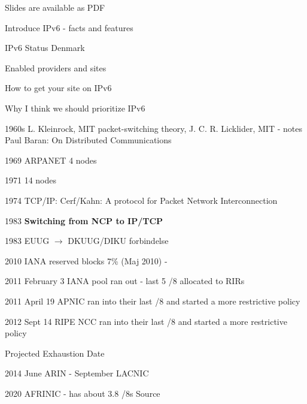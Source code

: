 \documentclass[28pt,landscape,a4paper,footrule]{foils}
\begin{document}


\vskip 2cm
\centerline{\footnotesize Slides are available as PDF}




\begin{list1}
\item Introduce IPv6 - facts and features
\item IPv6 Status Denmark
\item Enabled providers and sites
\item How to get your site on IPv6
\item Why I think we should prioritize IPv6
\end{list1}



\begin{list2}  
\item[1960s]  L. Kleinrock, MIT packet-switching theory,  J. C. R. Licklider, MIT - notes 
  Paul Baran: On Distributed Communications
\item[1969]  ARPANET 4 nodes
\item[1971]  14 nodes
\item[1974]  TCP/IP: Cerf/Kahn: A protocol for Packet
        Network Interconnection
\item[1983]  {\bf Switching from NCP to IP/TCP}
\item[1983]  EUUG $\rightarrow$ DKUUG/DIKU forbindelse
\item[2010] IANA reserved blocks 7\% (Maj 2010) - 
\item[2011] February 3 IANA pool ran out - last 5 /8 allocated to RIRs
\item[2011] April 19 APNIC ran into their last /8 and started a more restrictive policy
\item[2012] Sept 14 RIPE NCC ran into their last /8 and started a more restrictive policy
\end{list2}


\begin{list2}  
\item Projected Exhaustion Date
\item[2014] June ARIN - September LACNIC
\item[2020] AFRINIC - has about 3.8 /8s Source 
\end{list2}
\end{document}
